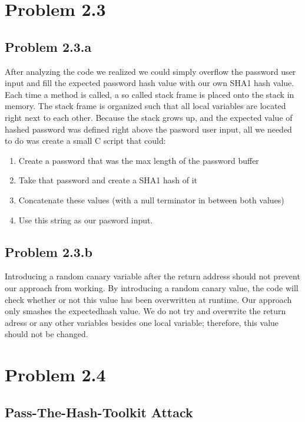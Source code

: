 \documentclass[psamsfonts]{amsart}
\begin{document}
 \section{Problem 2.3}

 \subsection{Problem 2.3.a}
 After analyzing the code we realized we could simply overflow the password user input and fill the expected password hash value with our own SHA1 hash value.  Each time a method is called, a so called stack frame is placed onto the stack in memory.  The stack frame is organized such that all local variables are located right next to each other.  Because the stack grows up, and the expected value of hashed password was defined right above the pasword user input, all we needed to do was create a small C script that could:

     \begin{enumerate}[(1)]
       \item Create a password that was the max length of the password buffer
       \item Take that password and create a SHA1 hash of it
       \item Concatenate these values (with a null terminator in between both values)
       \item Use this string as our pasword input.
     \end{enumerate}

 \subsection{Problem 2.3.b}
    Introducing a random canary variable after the return address should not prevent our approach from working.  By introducing a random canary value, the code will check whether or not this value has been overwritten at runtime.  Our approach only smashes the expectedhash value.  We do not try and overwrite the return adress or any other variables besides one local variable; therefore, this value should not be changed.

\section{Problem 2.4}

\subsection{Pass-The-Hash-Toolkit Attack}
\end{document}
